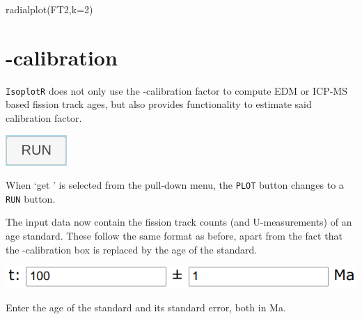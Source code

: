 \begin{refsection}
\begin{console}
radialplot(FT2,k=2)
\end{console}

\section{\textzeta-calibration}

\texttt{IsoplotR} does not only use the \textzeta-calibration factor
to compute EDM or ICP-MS based fission track ages, but also provides
functionality to estimate said calibration factor.\\

\noindent\begin{minipage}[t]{.1\linewidth}
\strut\vspace*{-\baselineskip}\newline
\includegraphics[width=\linewidth]{../figures/RUN.png}
\end{minipage}
\begin{minipage}[t]{.9\linewidth}
  When `get \textzeta' is selected from the pull-down menu, the
  \texttt{PLOT} button changes to a \texttt{RUN} button.\\
\end{minipage}

The input data now contain the fission track counts (and
U-measurements) of an age standard. These follow the same format as
before, apart from the fact that the \textzeta-calibration box is
replaced by the age of the standard.\\

\noindent\begin{minipage}[t]{.5\linewidth}
\strut\vspace*{-\baselineskip}\newline
\includegraphics[width=\linewidth]{../figures/FTzetaT.png}
\end{minipage}
\begin{minipage}[t]{.5\linewidth}
Enter the age of the standard and its standard error, both in Ma.\\
\end{minipage}


\end{refsection}
